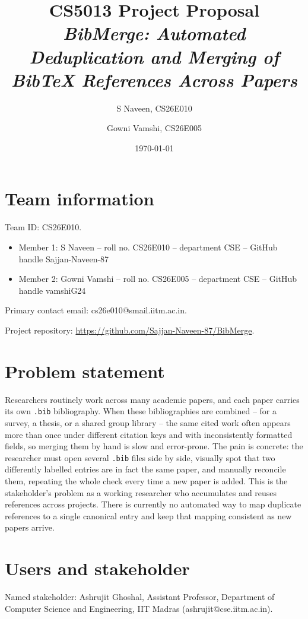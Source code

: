 \documentclass[11pt,a4paper]{article}
\title{CS5013 Project Proposal \\ \large\textit{BibMerge: Automated Deduplication and
Merging of BibTeX References Across Papers}}
\author{S Naveen, CS26E010 \and Gowni Vamshi, CS26E005}
\date{\today}
\begin{document}
\maketitle

\section{Team information}

Team ID: CS26E010.

\begin{itemize}[nosep]
  \item Member 1: S Naveen -- roll no. CS26E010 -- department CSE
        -- GitHub handle Sajjan-Naveen-87
  \item Member 2: Gowni Vamshi -- roll no. CS26E005 -- department CSE
        -- GitHub handle vamshiG24
\end{itemize}

Primary contact email: cs26e010@smail.iitm.ac.in.

Project repository: \url{https://github.com/Sajjan-Naveen-87/BibMerge}.

\section{Problem statement}

Researchers routinely work across many academic papers, and each paper
carries its own \texttt{.bib} bibliography. When these bibliographies are
combined -- for a survey, a thesis, or a shared group library -- the same
cited work often appears more than once under different citation keys and
with inconsistently formatted fields, so merging them by hand is slow and
error-prone. The pain is concrete: the researcher must open several
\texttt{.bib} files side by side, visually spot that two differently
labelled entries are in fact the same paper, and manually reconcile them,
repeating the whole check every time a new paper is added. This is the
stakeholder's problem as a working researcher who accumulates and reuses
references across projects. There is currently no automated way to map
duplicate references to a single canonical entry and keep that mapping
consistent as new papers arrive.

\section{Users and stakeholder}

Named stakeholder: Ashrujit Ghoshal, Assistant Professor,
Department of Computer Science and Engineering, IIT Madras
(ashrujit@cse.iitm.ac.in).
\end{document}
